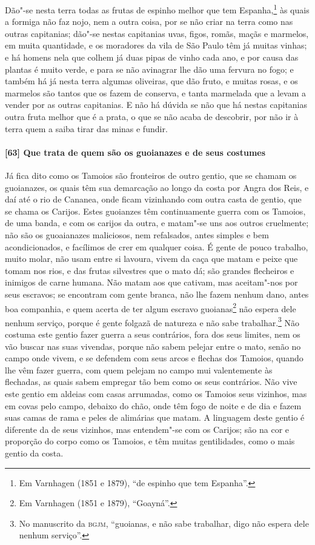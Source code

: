 Dão"-se nesta terra todas as frutas de espinho melhor que tem Espanha,\footnote{ Em
Varnhagen (1851 e 1879), ``de espinho que tem Espanha''.} às quais a formiga não faz nojo,
nem a outra coisa, por se não criar na terra como nas outras capitanias; dão"-se nestas
capitanias uvas, figos, romãs, maçãs e marmelos, em muita quantidade, e os moradores da
vila de São Paulo têm já muitas vinhas; e há homens nela que colhem já duas pipas de vinho
cada ano, e por causa das plantas é muito verde, e para se não avinagrar lhe dão uma
fervura no fogo; e também há já nesta terra algumas oliveiras, que dão fruto, e muitas
rosas, e os marmelos são tantos que os fazem de conserva, e tanta marmelada que a levam a
vender por as outras capitanias. E não há dúvida se não que há nestas capitanias outra
fruta melhor que é a prata, o que se não acaba de descobrir, por não ir à terra quem a
saiba tirar das minas e fundir.

\paragraph{[63] Que trata de quem são os guoianazes e de seus costumes} \quad
Já fica dito como os Tamoios são fronteiros de outro gentio, que se chamam os guoianazes,
os quais têm sua demarcação ao longo da costa por Angra dos Reis, e daí até o rio de
Cananea, onde ficam vizinhando com outra casta de gentio, que se chama os Carijos. Estes
guoianzes têm continuamente guerra com os Tamoios, de uma banda, e com os carijos da
outra, e matam"-se uns aos outros cruelmente; não são os guoaianazes maliciosos, nem
refalsados, antes simples e bem acondicionados, e facílimos de crer em qualquer coisa. É
gente de pouco trabalho, muito molar, não usam entre si lavoura, vivem da caça que matam e
peixe que tomam nos rios, e das frutas silvestres que o mato dá; são grandes flecheiros e
inimigos de carne humana. Não matam aos que cativam, mas aceitam"-nos por seus escravos; se
encontram com gente branca, não lhe fazem nenhum dano, antes boa companhia, e quem acerta
de ter algum escravo guoianas\footnote{ Em Varnhagen (1851 e 1879), ``Goayná''.} não
espera dele nenhum serviço, porque é gente folgazã de natureza e não sabe
trabalhar.\footnote{ No manuscrito da \textsc{bgjm}, ``guoianas, e não sabe trabalhar,
digo não espera dele nenhum serviço''.} Não costuma este gentio fazer guerra a seus
contrários, fora dos seus limites, nem os vão buscar nas suas vivendas, porque não sabem
pelejar entre o mato, senão no campo onde vivem, e se defendem com seus arcos e flechas
dos Tamoios, quando lhe vêm fazer guerra, com quem pelejam no campo mui valentemente às
flechadas, as quais sabem empregar tão bem como os seus contrários. Não vive este gentio
em aldeias com casas arrumadas, como os Tamoios seus vizinhos, mas em covas pelo campo,
debaixo do chão, onde têm fogo de noite e de dia e fazem suas camas de rama e peles de
alimárias que matam. A linguagem deste gentio é diferente da de seus vizinhos, mas
entendem"-se com os Carijos; são na cor e proporção do corpo como os Tamoios, e têm muitas
gentilidades, como o mais gentio da costa.

